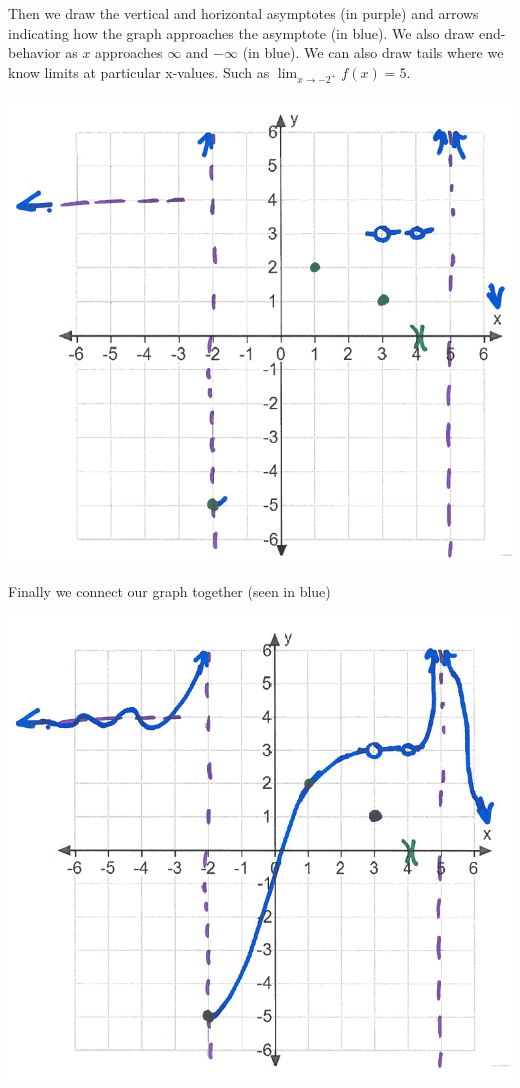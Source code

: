\documentclass[nooutcomes]{ximera}
\begin{document}
\begin{problem}
\begin{freeResponse}
	Then we draw the vertical  and horizontal asymptotes (in purple) and arrows indicating how the graph approaches the asymptote (in blue).  We also draw end-behavior as $x$ approaches $\infty$ and $-\infty$ (in blue).  We can also draw tails where we know limits at particular x-values.  Such as $ \lim_{x \to -2^+}f(x)=5$.
	\begin{image}
	\includegraphics[scale = 0.4]{figure11.png}
	\end{image}

	Finally we connect our graph together (seen in blue)
	\begin{image}
    \includegraphics[scale = 0.4]{figure12.png}  
	\end{image}

  \end{freeResponse}
\end{problem}
\end{document}
